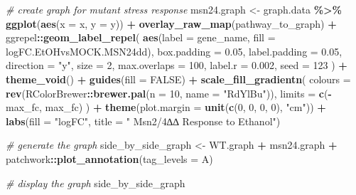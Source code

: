 \documentclass[
]{book}
\newenvironment{Shaded}{\begin{snugshade}}{\end{snugshade}}
\newcommand{\AttributeTok}[1]{\textcolor[rgb]{0.13,0.29,0.53}{#1}}
\newcommand{\CommentTok}[1]{\textcolor[rgb]{0.56,0.35,0.01}{\textit{#1}}}
\newcommand{\ConstantTok}[1]{\textcolor[rgb]{0.56,0.35,0.01}{#1}}
\newcommand{\DecValTok}[1]{\textcolor[rgb]{0.00,0.00,0.81}{#1}}
\newcommand{\FloatTok}[1]{\textcolor[rgb]{0.00,0.00,0.81}{#1}}
\newcommand{\FunctionTok}[1]{\textcolor[rgb]{0.13,0.29,0.53}{\textbf{#1}}}
\newcommand{\NormalTok}[1]{#1}
\newcommand{\OtherTok}[1]{\textcolor[rgb]{0.56,0.35,0.01}{#1}}
\newcommand{\SpecialCharTok}[1]{\textcolor[rgb]{0.81,0.36,0.00}{\textbf{#1}}}
\newcommand{\StringTok}[1]{\textcolor[rgb]{0.31,0.60,0.02}{#1}}
\begin{document}
\begin{Shaded}
\begin{Highlighting}[]
\CommentTok{\# create graph for mutant stress response}
\NormalTok{msn24.graph }\OtherTok{\textless{}{-}}\NormalTok{ graph.data }\SpecialCharTok{\%\textgreater{}\%}
  \FunctionTok{ggplot}\NormalTok{(}\FunctionTok{aes}\NormalTok{(}\AttributeTok{x =}\NormalTok{ x, }\AttributeTok{y =}\NormalTok{ y)) }\SpecialCharTok{+}
  \FunctionTok{overlay\_raw\_map}\NormalTok{(pathway\_to\_graph) }\SpecialCharTok{+}
\NormalTok{  ggrepel}\SpecialCharTok{::}\FunctionTok{geom\_label\_repel}\NormalTok{(}
    \FunctionTok{aes}\NormalTok{(}\AttributeTok{label =}\NormalTok{ gene\_name, }\AttributeTok{fill =}\NormalTok{ logFC.EtOHvsMOCK.MSN24dd),}
    \AttributeTok{box.padding =} \FloatTok{0.05}\NormalTok{,}
    \AttributeTok{label.padding =} \FloatTok{0.05}\NormalTok{,}
    \AttributeTok{direction =} \StringTok{"y"}\NormalTok{,}
    \AttributeTok{size =} \DecValTok{2}\NormalTok{,}
    \AttributeTok{max.overlaps =} \DecValTok{100}\NormalTok{,}
    \AttributeTok{label.r =} \FloatTok{0.002}\NormalTok{,}
    \AttributeTok{seed =} \DecValTok{123}
\NormalTok{  ) }\SpecialCharTok{+}
  \FunctionTok{theme\_void}\NormalTok{() }\SpecialCharTok{+}
  \FunctionTok{guides}\NormalTok{(}\AttributeTok{fill =} \ConstantTok{FALSE}\NormalTok{) }\SpecialCharTok{+}
  \FunctionTok{scale\_fill\_gradientn}\NormalTok{(}
    \AttributeTok{colours =} \FunctionTok{rev}\NormalTok{(RColorBrewer}\SpecialCharTok{::}\FunctionTok{brewer.pal}\NormalTok{(}\AttributeTok{n =} \DecValTok{10}\NormalTok{, }\AttributeTok{name =} \StringTok{"RdYlBu"}\NormalTok{)),}
    \AttributeTok{limits =} \FunctionTok{c}\NormalTok{(}\SpecialCharTok{{-}}\NormalTok{max\_fc, max\_fc)}
\NormalTok{  ) }\SpecialCharTok{+}
  \FunctionTok{theme}\NormalTok{(}\AttributeTok{plot.margin =} \FunctionTok{unit}\NormalTok{(}\FunctionTok{c}\NormalTok{(}\DecValTok{0}\NormalTok{, }\DecValTok{0}\NormalTok{, }\DecValTok{0}\NormalTok{, }\DecValTok{0}\NormalTok{), }\StringTok{"cm"}\NormalTok{)) }\SpecialCharTok{+}
  \FunctionTok{labs}\NormalTok{(}\AttributeTok{fill =} \StringTok{"logFC"}\NormalTok{, }\AttributeTok{title =} \StringTok{"      Msn2/4∆∆ Response to Ethanol"}\NormalTok{)}



\CommentTok{\# generate the graph}
\NormalTok{side\_by\_side\_graph }\OtherTok{\textless{}{-}}\NormalTok{ WT.graph }\SpecialCharTok{+}\NormalTok{ msn24.graph }\SpecialCharTok{+}
\NormalTok{  patchwork}\SpecialCharTok{::}\FunctionTok{plot\_annotation}\NormalTok{(}\AttributeTok{tag\_levels =} \StringTok{\textquotesingle{}A\textquotesingle{}}\NormalTok{)}

\CommentTok{\# display the graph}
\NormalTok{side\_by\_side\_graph}
\end{Highlighting}
\end{Shaded}
\end{document}
